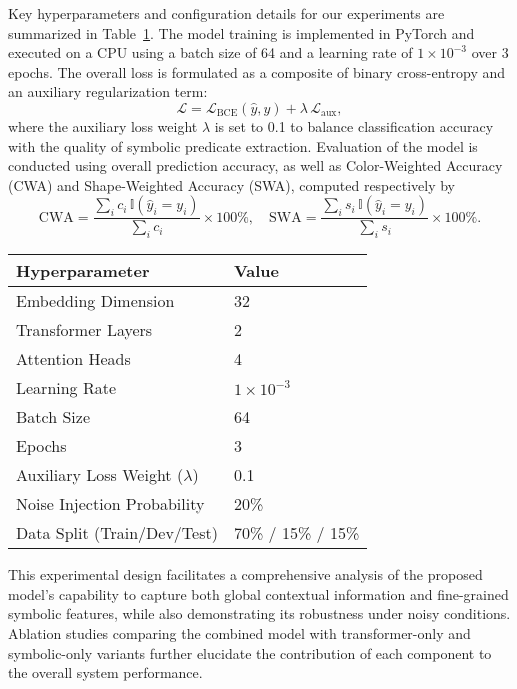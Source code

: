 \documentclass{article}
\begin{document}
Key hyperparameters and configuration details for our experiments are summarized in Table~\ref{tab:hyperparams}. The model training is implemented in PyTorch and executed on a CPU using a batch size of 64 and a learning rate of \(1\times10^{-3}\) over 3 epochs. The overall loss is formulated as a composite of binary cross-entropy and an auxiliary regularization term:
\[
\mathcal{L} = \mathcal{L}_{\text{BCE}}(\hat{y}, y) + \lambda\, \mathcal{L}_{\text{aux}},
\]
where the auxiliary loss weight \(\lambda\) is set to 0.1 to balance classification accuracy with the quality of symbolic predicate extraction. Evaluation of the model is conducted using overall prediction accuracy, as well as Color-Weighted Accuracy (CWA) and Shape-Weighted Accuracy (SWA), computed respectively by
\[
\text{CWA} = \frac{\sum_{i} c_i\,\mathbb{I}(\hat{y}_i = y_i)}{\sum_{i} c_i}\times 100\%, \quad \text{SWA} = \frac{\sum_{i} s_i\,\mathbb{I}(\hat{y}_i = y_i)}{\sum_{i} s_i}\times 100\%.
\]

\begin{table}[ht]
\centering
\begin{tabular}{ll}
\hline
\textbf{Hyperparameter} & \textbf{Value} \\
\hline
Embedding Dimension & 32 \\
Transformer Layers & 2 \\
Attention Heads & 4 \\
Learning Rate & \(1\times10^{-3}\) \\
Batch Size & 64 \\
Epochs & 3 \\
Auxiliary Loss Weight (\(\lambda\)) & 0.1 \\
Noise Injection Probability & 20\% \\
Data Split (Train/Dev/Test) & 70\% / 15\% / 15\% \\
\hline
\end{tabular}
\label{tab:hyperparams}
\end{table}

This experimental design facilitates a comprehensive analysis of the proposed model's capability to capture both global contextual information and fine-grained symbolic features, while also demonstrating its robustness under noisy conditions. Ablation studies comparing the combined model with transformer-only and symbolic-only variants further elucidate the contribution of each component to the overall system performance.
\end{document}
